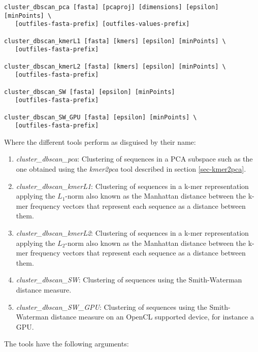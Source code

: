 \begin{lstlisting}
cluster_dbscan_pca [fasta] [pcaproj] [dimensions] [epsilon] [minPoints] \
   [outfiles-fasta-prefix] [outfiles-values-prefix]

cluster_dbscan_kmerL1 [fasta] [kmers] [epsilon] [minPoints] \
   [outfiles-fasta-prefix]

cluster_dbscan_kmerL2 [fasta] [kmers] [epsilon] [minPoints] \
   [outfiles-fasta-prefix]

cluster_dbscan_SW [fasta] [epsilon] [minPoints]
   [outfiles-fasta-prefix]

cluster_dbscan_SW_GPU [fasta] [epsilon] [minPoints] \
   [outfiles-fasta-prefix]   
\end{lstlisting}
Where the different tools perform as disguised by their name:
\begin{enumerate}
  \item \emph{cluster\_dbscan\_pca}: Clustering of sequences in a PCA
    subspace such as the one obtained using the \emph{kmer2pca} tool
    described in section \ref{sec-kmer2pca}.
  \item \emph{cluster\_dbscan\_kmerL1}: Clustering of sequences in a
    k-mer representation applying the $L_1$-norm also known as the
    Manhattan distance between the k-mer frequency vectors that
    represent each sequence as a distance between them.
  \item \emph{cluster\_dbscan\_kmerL2}: Clustering of sequences in a
    k-mer representation applying the $L_2$-norm also known as the
    Manhattan distance between the k-mer frequency vectors that
    represent each sequence as a distance between them.
  \item \emph{cluster\_dbscan\_SW}: Clustering of sequences using the
    Smith-Waterman distance measure.
  \item \emph{cluster\_dbscan\_SW\_GPU}: Clustering of sequences using
    the Smith-Waterman distance measure on an OpenCL supported device,
    for instance a GPU.
\end{enumerate}
The tools have the following arguments:
